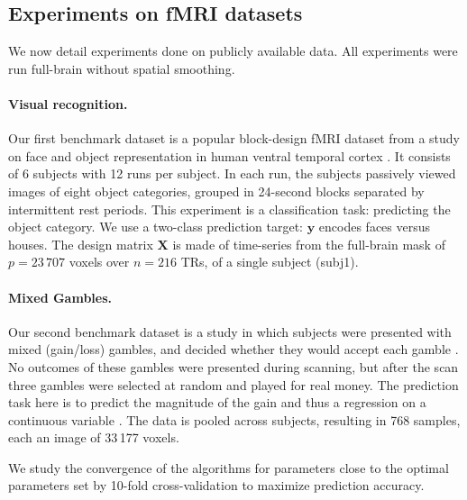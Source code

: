 \subsection{Experiments on fMRI datasets}
\label{sec:experiments}
We now detail experiments done on publicly available
data. All experiments were run full-brain without spatial smoothing.

\paragraph{Visual recognition.}
\label{subsec:haxby}
Our first benchmark dataset is a popular block-design fMRI dataset from a study on face and
object representation in human ventral temporal cortex  \citep{haxby2001}.
It consists of
6 subjects with 12 runs per subject. In each run, the subjects
passively viewed images of eight object categories, grouped
in 24-second blocks separated by intermittent rest periods. This
experiment is a classification task: predicting the object category. We use a
two-class prediction target: $\mathbf{y}$ encodes faces versus houses.
The design matrix $\mathbf{X}$ is made of
time-series from the full-brain mask of $p = 23\,707$ voxels over $n =
216$ TRs, of a single subject (subj1).

\paragraph{Mixed Gambles.}
Our second benchmark dataset is a study in which
subjects were presented with mixed (gain/loss) gambles, and decided
whether they would accept each gamble \citep{mixedgambles2007}.  No outcomes of these gambles
were presented during scanning, but after the scan three gambles were
selected at random and played for real money. The prediction task here is
to predict the magnitude of the gain and thus a regression on a
continuous variable \citep{jimura2012}. The data is pooled across
subjects, resulting in 768 samples, each an image of 33\,177 voxels.

\smallskip

We study the convergence of the algorithms for parameters close to the
optimal parameters set by 10-fold cross-validation to maximize prediction
accuracy.

